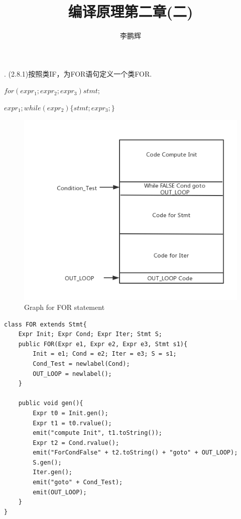 \documentclass[a4paper, 16pt]{article}
\title{编译原理第二章(二)}
\author{李鹏辉}
\begin{document}
. (2.8.1)按照类IF，为FOR语句定义一个类FOR. \\

\centerline{$for ( expr_1 ; expr_2 ; expr_3 ) stmt;$}
\centerline{$expr_1; while( expr_2) \{stmt; expr_3; \}$}
\begin{figure}[H]
\centering
\includegraphics[scale=0.6]{chapter2_hw2_1}
\caption{Graph for FOR statement}
\end{figure}

\lstset{language=C}
\begin{lstlisting}
class FOR extends Stmt{
	Expr Init; Expr Cond; Expr Iter; Stmt S;
	public FOR(Expr e1, Expr e2, Expr e3, Stmt s1){
		Init = e1; Cond = e2; Iter = e3; S = s1; 
		Cond_Test = newlabel(Cond); 
		OUT_LOOP = newlabel();
	}
	
	public void gen(){
		Expr t0 = Init.gen();
		Expr t1 = t0.rvalue();
		emit("compute Init", t1.toString());
		Expr t2 = Cond.rvalue();
		emit("ForCondFalse" + t2.toString() + "goto" + OUT_LOOP);
		S.gen();
		Iter.gen();
		emit("goto" + Cond_Test);
		emit(OUT_LOOP);
	}
}
\end{lstlisting}
\end{document}
